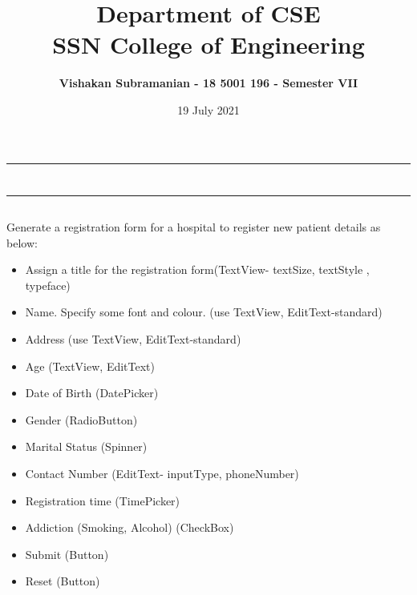 \documentclass[12pt, a4]{article}
\title{\textbf{Department of CSE\\SSN College of Engineering}}
\author{\textbf{Vishakan Subramanian - 18 5001 196 - Semester VII}}
\date{19 July 2021}
\begin{document}
\maketitle
\hrule
\section*{}
\hrule
\bigskip

\subsection*{}
\subsection*{}
\begin{flushleft}
Generate a registration form for a hospital to register new patient details as below:

\begin{itemize}
\item Assign a title for the registration form(TextView- textSize, textStyle , typeface)
\item Name. Specify some font and colour. (use TextView, EditText-standard)
\item Address (use TextView, EditText-standard)
\item Age (TextView, EditText)
\item Date of Birth (DatePicker)
\item Gender (RadioButton)
\item Marital Status (Spinner)
\item Contact Number (EditText- inputType, phoneNumber)
\item Registration time (TimePicker)
\item Addiction (Smoking, Alcohol) (CheckBox)
\item Submit (Button)
\item Reset (Button)

\end{itemize}
\end{flushleft}

\newpage
\subsection*{}
\begin{flushleft}

\end{flushleft}
\end{document}
